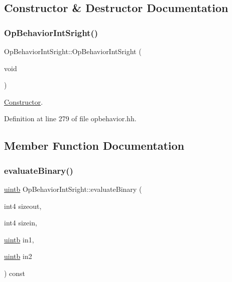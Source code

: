 \subsection{Constructor \& Destructor Documentation}
\mbox{\label{class_op_behavior_int_sright_ac67bee74a004ef2c272d234f033b7930}} 
\subsubsection{\texorpdfstring{OpBehaviorIntSright()}{OpBehaviorIntSright()}}
{\footnotesize\ttfamily Op\+Behavior\+Int\+Sright\+::\+Op\+Behavior\+Int\+Sright (\begin{DoxyParamCaption}\item[{void}]{ }\end{DoxyParamCaption})\hspace{0.3cm}{\ttfamily [inline]}}



\mbox{\hyperlink{class_constructor}{Constructor}}. 



Definition at line 279 of file opbehavior.\+hh.



\subsection{Member Function Documentation}
\mbox{\label{class_op_behavior_int_sright_a967f44cf3750ee66485784adcd973bec}} 
\subsubsection{\texorpdfstring{evaluateBinary()}{evaluateBinary()}}
{\footnotesize\ttfamily \mbox{\hyperlink{types_8h_a2db313c5d32a12b01d26ac9b3bca178f}{uintb}} Op\+Behavior\+Int\+Sright\+::evaluate\+Binary (\begin{DoxyParamCaption}\item[{int4}]{sizeout,  }\item[{int4}]{sizein,  }\item[{\mbox{\hyperlink{types_8h_a2db313c5d32a12b01d26ac9b3bca178f}{uintb}}}]{in1,  }\item[{\mbox{\hyperlink{types_8h_a2db313c5d32a12b01d26ac9b3bca178f}{uintb}}}]{in2 }\end{DoxyParamCaption}) const\hspace{0.3cm}{\ttfamily [virtual]}}



